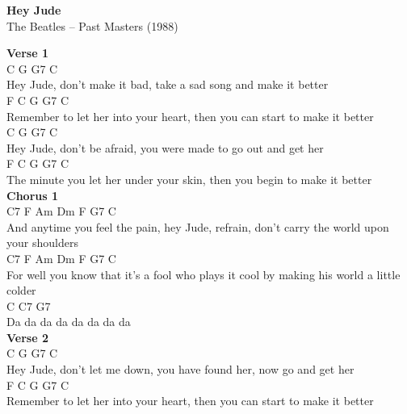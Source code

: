 \documentclass[a4paper]{article}
\begin{document}
    \begin{center}
        \textbf{Hey Jude}
        ~\\
        The Beatles -- Past Masters (1988)
    \end{center}
    {
        \scriptsize
        \textbf{Verse 1}
        ~\\
        {
            \cutive
            \obeyspaces
    C                   G           G7                   C
\\
Hey Jude, don't make it bad, take a sad song and make it better
\\
  F                           C                    G       G7      C
\\
Remember to let her into your heart, then you can start to make it better
\\
    C               G               G7                 C
\\
Hey Jude, don't be afraid, you were made to go out and get her 
\\
    F                             C                G      G7      C
\\
The minute you let her under your skin, then you begin to make it better
\\

        }
        \textbf{Chorus 1}
        ~\\
        {
            \cutive
            \obeyspaces
C7                       F         Am      Dm           F         G7              C
\\
And anytime you feel the pain, hey Jude, refrain, don't carry the world upon your shoulders
\\
C7                            F        Am       Dm      F          G7             C
\\
For well you know that it's a fool who plays it cool by making his world a little colder
\\
C        C7    G7
\\
Da da da da da da da da
\\

        }
        \textbf{Verse 2}
        ~\\
        {
            \cutive
            \obeyspaces
    C                  G              G7                    C
\\
Hey Jude, don't let me down, you have found her, now go and get her
\\
  F                           C                   G        G7      C
\\
Remember to let her into your heart, then you can start to make it better
\\

}}
\end{document}
